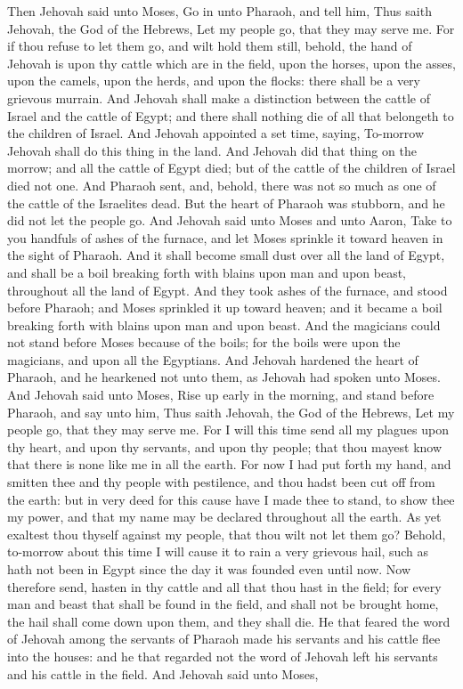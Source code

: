 Then Jehovah said unto Moses, Go in unto Pharaoh, and tell him, Thus saith Jehovah, the God of the Hebrews, Let my people go, that they may serve me. For if thou refuse to let them go, and wilt hold them still, behold, the hand of Jehovah is upon thy cattle which are in the field, upon the horses, upon the asses, upon the camels, upon the herds, and upon the flocks: there shall be a very grievous murrain. And Jehovah shall make a distinction between the cattle of Israel and the cattle of Egypt; and there shall nothing die of all that belongeth to the children of Israel. And Jehovah appointed a set time, saying, To-morrow Jehovah shall do this thing in the land. And Jehovah did that thing on the morrow; and all the cattle of Egypt died; but of the cattle of the children of Israel died not one. And Pharaoh sent, and, behold, there was not so much as one of the cattle of the Israelites dead. But the heart of Pharaoh was stubborn, and he did not let the people go.  And Jehovah said unto Moses and unto Aaron, Take to you handfuls of ashes of the furnace, and let Moses sprinkle it toward heaven in the sight of Pharaoh. And it shall become small dust over all the land of Egypt, and shall be a boil breaking forth with blains upon man and upon beast, throughout all the land of Egypt. And they took ashes of the furnace, and stood before Pharaoh; and Moses sprinkled it up toward heaven; and it became a boil breaking forth with blains upon man and upon beast. And the magicians could not stand before Moses because of the boils; for the boils were upon the magicians, and upon all the Egyptians. And Jehovah hardened the heart of Pharaoh, and he hearkened not unto them, as Jehovah had spoken unto Moses.  And Jehovah said unto Moses, Rise up early in the morning, and stand before Pharaoh, and say unto him, Thus saith Jehovah, the God of the Hebrews, Let my people go, that they may serve me. For I will this time send all my plagues upon thy heart, and upon thy servants, and upon thy people; that thou mayest know that there is none like me in all the earth. For now I had put forth my hand, and smitten thee and thy people with pestilence, and thou hadst been cut off from the earth: but in very deed for this cause have I made thee to stand, to show thee my power, and that my name may be declared throughout all the earth. As yet exaltest thou thyself against my people, that thou wilt not let them go? Behold, to-morrow about this time I will cause it to rain a very grievous hail, such as hath not been in Egypt since the day it was founded even until now. Now therefore send, hasten in thy cattle and all that thou hast in the field; for every man and beast that shall be found in the field, and shall not be brought home, the hail shall come down upon them, and they shall die. He that feared the word of Jehovah among the servants of Pharaoh made his servants and his cattle flee into the houses: and he that regarded not the word of Jehovah left his servants and his cattle in the field.  And Jehovah said unto Moses, 